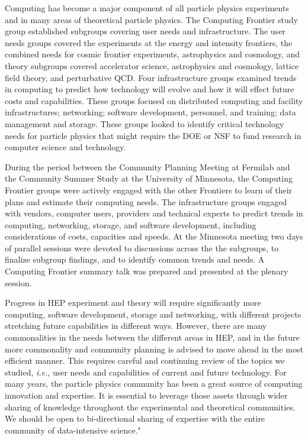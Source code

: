 Computing has become a major component of all particle physics experiments
and in many areas of theoretical particle physics. The Computing Frontier
study group established subgroups covering user needs and infrastructure.
The user needs groups covered the experiments at the energy and intensity
frontiers, the combined needs for cosmic frontier experiments, astrophysics
and cosmology, and theory subgroups covered accelerator science,
astrophysics and cosmology, lattice field theory, and perturbative QCD.
Four infrastructure groups examined trends in computing to predict how
technology will evolve and how it will effect future costs and
capabilities. These groups focused on distributed computing and facility
infrastructures; networking; software development, personnel, and training;
data management and storage. These groups looked to identify critical
technology needs for particle physics that might require the DOE or NSF to
fund research in computer science and technology.

During the period between the Community Planning Meeting at Fermilab and
the Community Summer Study at the University of Minnesota, the Computing
Frontier groups were actively engaged with the other Frontiers to learn of
their plans and estimate their computing needs. The infrastructure groups
engaged with vendors, computer users, providers and technical experts to
predict trends in computing, networking, storage, and software development,
including considerations of costs, capacities and speeds. At the Minnesota
meeting two days of parallel sessions were devoted to discussions across
the the subgroups, to finalize subgroup findings, and to identify common
trends and needs. A Computing Frontier summary talk was prepared and
presented at the plenary session.

Progress in HEP experiment and theory will require significantly more
computing, software development, storage and networking, with different
projects stretching future capabilities in different ways. However, there
are many commonalities in the needs between the different areas in HEP, and
in the future more commonality and community planning is advised to move
ahead in the most efficient manner. This requires careful and continuing
review of the topics we studied, {\it i.e.}, user needs and capabilities of
current and future technology. For many years, the particle physics
community has been a great source of computing innovation and expertise. It
is essential to leverage those assets through wider sharing of knowledge
throughout the experimental and theoretical communities. 
We should be open to bi-directional sharing of expertise with the entire
community of data-intensive science."

